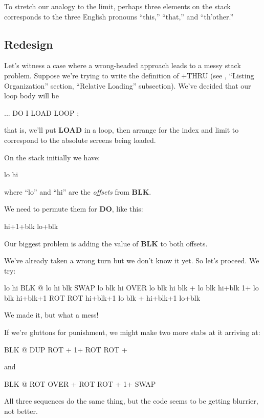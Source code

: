 To stretch our analogy to the limit, perhaps three elements on the
stack corresponds to the three English pronouns ``this,'' ``that,'' and
``th'other.''

\subsection{Redesign}

Let's witness a case where a wrong-headed approach leads to a messy
stack problem. Suppose we're trying to write the definition of +THRU
(see , ``Listing Organization'' section, ``Relative Loading''
subsection). We've decided that our loop body will be

\begin{Code}
...  DO  I LOAD  LOOP ;
\end{Code}
that is, we'll put \textbf{LOAD} in a loop, then arrange for the index and limit
to correspond to the absolute screens being loaded.

On the stack initially we have:

\begin{Code}
lo hi
\end{Code}
where ``lo'' and ``hi'' are the \emph{offsets} from \textbf{BLK}.

We need to permute them for \textbf{DO}, like this:

\begin{Code}
hi+1+blk lo+blk
\end{Code}
Our biggest problem is adding the value of \textbf{BLK} to both offsets.

We've already taken a wrong turn but we don't know it yet. So let's
proceed. We try:

\begin{Code}
lo hi
               BLK @
lo hi blk
               SWAP
lo blk hi
               OVER
lo blk hi blk
               +
lo blk hi+blk
               1+
lo blk hi+blk+1
               ROT ROT
hi+blk+1 lo blk
               +
hi+blk+1 lo+blk
\end{Code}
We made it, but what a mess!

If we're gluttons for punishment, we might make two more stabs at
it arriving at:

\begin{Code}
BLK @  DUP ROT + 1+  ROT ROT +
\end{Code}
and

\begin{Code}
BLK @  ROT OVER +  ROT ROT + 1+  SWAP
\end{Code}
All three sequences do the same thing, but the code seems to be getting
blurrier, not better.

